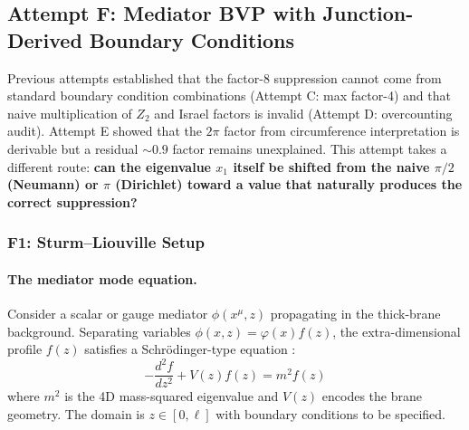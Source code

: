 
\subsection{Attempt F: Mediator BVP with Junction-Derived Boundary Conditions}
\label{sec:ch11_opr20_attemptF}

Previous attempts established that the factor-8 suppression cannot come from standard
boundary condition combinations (Attempt C: max factor-4) and that naive multiplication
of $Z_2$ and Israel factors is invalid (Attempt D: overcounting audit). Attempt E showed
that the $2\pi$ factor from circumference interpretation is derivable \tagDc{} but a
residual $\sim 0.9$ factor remains unexplained. This attempt takes a different route:
\textbf{can the eigenvalue $x_1$ itself be shifted from the naive $\pi/2$ (Neumann) or
$\pi$ (Dirichlet) toward a value that naturally produces the correct suppression?}

\subsubsection{F1: Sturm--Liouville Setup}
\label{sec:attemptF_setup}

\paragraph{The mediator mode equation.}
Consider a scalar or gauge mediator $\phi(x^\mu, z)$ propagating in the thick-brane
background. Separating variables $\phi(x,z) = \varphi(x) f(z)$, the extra-dimensional
profile $f(z)$ satisfies a Schr\"odinger-type equation \tagP{}:
\begin{equation}
    \boxed{
    -\frac{d^2 f}{dz^2} + V(z) f(z) = m^2 f(z)
    }
    \label{eq:attemptF_SL}
\end{equation}
where $m^2$ is the 4D mass-squared eigenvalue and $V(z)$ encodes the brane geometry.
The domain is $z \in [0, \ell]$ with boundary conditions to be specified.


